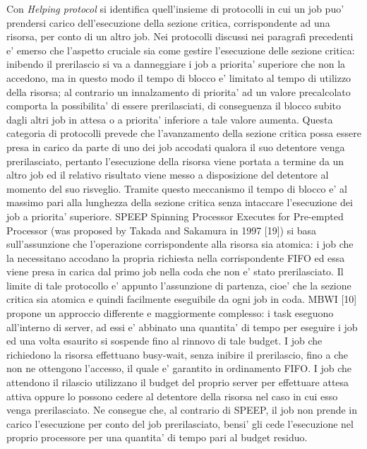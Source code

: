 Con \textit{Helping protocol} si identifica quell'insieme di protocolli in cui un job puo' prendersi carico dell'esecuzione della sezione critica, corrispondente ad una risorsa, per conto di un altro job. Nei protocolli discussi nei paragrafi precedenti e' emerso che l'aspetto cruciale sia come gestire l'esecuzione delle sezione critica: inibendo il prerilascio si va a danneggiare i job a priorita' superiore che non la accedono, ma in questo modo il tempo di blocco e' limitato al tempo di utilizzo della risorsa; al contrario un innalzamento di priorita' ad un valore precalcolato comporta la possibilita' di essere prerilasciati, di conseguenza il blocco subito dagli altri job in attesa o a priorita' inferiore a tale valore aumenta. Questa categoria di protocolli prevede che l'avanzamento della sezione critica possa essere presa in carico da parte di uno dei job accodati qualora il suo detentore venga prerilasciato, pertanto l'esecuzione della risorsa viene portata a termine da un altro job ed il relativo risultato viene messo a disposizione del detentore al momento del suo risveglio. Tramite questo meccanismo il tempo di blocco e' al massimo pari alla lunghezza della sezione critica senza intaccare l'esecuzione dei job a priorita' superiore.
SPEEP Spinning Processor Executes for Pre-empted Processor (was proposed by Takada and Sakamura in 1997 [19]) si basa sull'assunzione che l'operazione corrispondente alla risorsa sia atomica: i job che la necessitano accodano la propria richiesta nella corrispondente FIFO ed essa viene presa in carica dal primo job nella coda che non e' stato prerilasciato. Il limite di tale protocollo e' appunto l'assunzione di partenza, cioe' che la sezione critica sia atomica e quindi facilmente eseguibile da ogni job in coda.
MBWI [10] propone un approccio differente e maggiormente complesso: i task eseguono all'interno di server, ad essi e' abbinato una quantita' di tempo per eseguire i job ed una volta esaurito si sospende fino al rinnovo di tale budget. I job che richiedono la risorsa effettuano busy-wait, senza inibire il prerilascio, fino a che non ne ottengono l'accesso, il quale e' garantito in ordinamento FIFO. I job che attendono il rilascio utilizzano il budget del proprio server per effettuare attesa attiva oppure lo possono cedere al detentore della risorsa nel caso in cui esso venga prerilasciato. Ne consegue che, al contrario di SPEEP, il job non prende in carico l'esecuzione per conto del job prerilasciato, bensi' gli cede l'esecuzione nel proprio processore per una quantita' di tempo pari al budget residuo.

